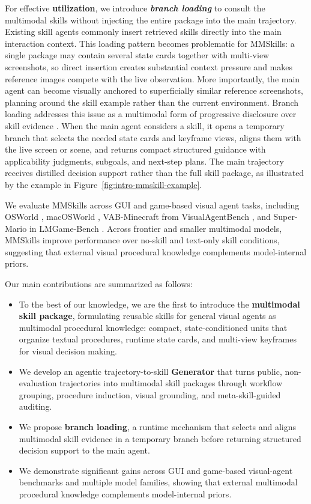 For effective \textbf{utilization}, we introduce \textit{\textbf{branch loading}} to consult the multimodal skills without injecting the entire package into the main trajectory. Existing skill agents commonly insert retrieved skills directly into the main interaction context. This loading pattern becomes problematic for MMSkills: a single package may contain several state cards together with multi-view screenshots, so direct insertion creates substantial context pressure and makes reference images compete with the live observation. More importantly, the main agent can become visually anchored to superficially similar reference screenshots, planning around the skill example rather than the current environment. Branch loading addresses this issue as a multimodal form of progressive disclosure over skill evidence \citep{xu2026agentskills}. When the main agent considers a skill, it opens a temporary branch that selects the needed state cards and keyframe views, aligns them with the live screen or scene, and returns compact structured guidance with applicability judgments, subgoals, and next-step plans. The main trajectory receives distilled decision support rather than the full skill package, as illustrated by the example in Figure~\ref{fig:intro-mmskill-example}.

We evaluate MMSkills across GUI and game-based visual agent tasks, including OSWorld \citep{xie2024osworld}, macOSWorld \citep{yang2025macosworld}, VAB-Minecraft from VisualAgentBench \citep{liu2024visualagentbench}, and Super-Mario in LMGame-Bench \citep{hu2025lmgamebenchgoodllmsplaying}. Across frontier and smaller multimodal models, MMSkills improve performance over no-skill and text-only skill conditions, suggesting that external visual procedural knowledge complements model-internal priors.

Our main contributions are summarized as follows:
\begin{itemize}[leftmargin=*]
    \item To the best of our knowledge, we are the first to introduce the \textbf{multimodal skill package}, formulating reusable skills for general visual agents as multimodal procedural knowledge: compact, state-conditioned units that organize textual procedures, runtime state cards, and multi-view keyframes for visual decision making.
    \item We develop an agentic trajectory-to-skill \textbf{Generator} that turns public, non-evaluation trajectories into multimodal skill packages through workflow grouping, procedure induction, visual grounding, and meta-skill-guided auditing.
    \item We propose \textbf{branch loading}, a runtime mechanism that selects and aligns multimodal skill evidence in a temporary branch before returning structured decision support to the main agent.
    \item We demonstrate significant gains across GUI and game-based visual-agent benchmarks and multiple model families, showing that external multimodal procedural knowledge complements model-internal priors.
\end{itemize}
